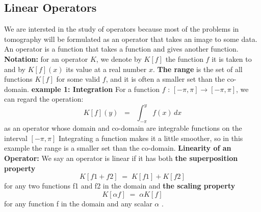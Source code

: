 \documentclass{article}
\begin{document}
\subsection{Linear Operators}
We are intersted in the study of operators because most of the problems in tomography will be formulated as an operator that takes an image to some data.
\newline
An operator is a function that takes a function and gives another function.
\newline
\vspace{0.1cm}
\newline
\textbf{Notation: }for an operator $K$, we denote by $K[f]$ the function $f$ it is taken to and by $K[f](x)$ its value at a real number $x$.
\newline
\vspace{0,1cm}
\newline
\textbf{The range} is the set of all functions $K[f]$ for some valid $f$, and it is often a smaller set than the co-domain.
\vspace{0.5cm}
\newline
\textbf{example 1: Integration}
\newline
For a function $f$ : $[-\pi, \pi] \rightarrow [-\pi,\pi]$, we can regard the operation:
$$ K[f](y) \; \; = \; \; \int_{-\pi}^{y} f(x) \,dx$$
	as an operator whose domain and co-domain are integrable functions on the interval $[-\pi, \pi] $ 
	\newline 
	Integrating a function makes it a little smoother, so in this example the range is a smaller set than the co-domain.
\newline
\vspace{0.2cm}
\newline
\textbf{Linearity of an Operator:}
\newline
We say an operator is linear if it has both \textbf{the superposition property} 
	$$  K[f1 + f2] \; = \; K[f1] + K[f2]$$ 
	for any two functions f1 and f2 in the domain and \textbf{the scaling property} 
	$$ K[\alpha f] \; = \; \alpha K[f]$$
	for any function f in the domain and any scalar $\alpha$ .
\end{document}

